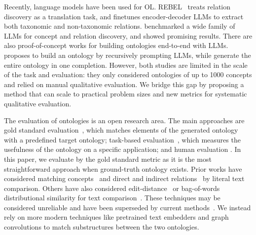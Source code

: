 \documentclass{article}
\begin{document}
Recently, language models have been used for OL. REBEL~\cite{cabot2021rebel} treats relation discovery as a translation task, and finetunes encoder-decoder LLMs to extract both taxonomic and non-taxonomic relations. \citet{babaei2023llms4ol} benchmarked a wide family of LLMs for concept and relation discovery, and showed promising results. There are also proof-of-concept works for building ontologies end-to-end with LLMs. \citet{funk2023towards} proposes to build an ontology by recursively prompting  LLMs, while \citet{trajanoska2023enhancing} generate the entire ontology in one completion. However, both studies are limited in the scale of the task and evaluation: they only considered ontologies of up to 1000 concepts and relied on manual qualitative evaluation. We bridge this gap by proposing a method that can scale to practical problem sizes and new metrics for systematic qualitative evaluation.

The evaluation of ontologies is an open research area. The main approaches are gold standard evaluation~\cite{Zavitsanos2011GoldSE}, which matches elements of the generated ontology with a predefined target ontology; task-based evaluation~\cite{porzel2004task}, which measures the usefulness of the ontology on a specific application; and human evaluation \cite{raad2015survey,brank2005survey}. In this paper, we evaluate by the gold standard metric as it is the most straightforward approach when ground-truth ontology exists. Prior works have considered matching concepts~\cite{maedche2002measuring} and direct and indirect relations~\cite{Kashyap2005TaxaMinerAE, Treeratpituk2013GraphbasedAT} by literal text comparison. Others have also considered edit-distance~\cite{Ehrig2005SimilarityFO} or bag-of-words distributional similarity for text comparison~\cite{Zavitsanos2011GoldSE}.  These techniques may be considered unreliable and have been superseded by current methods~\cite{conneau2017supervised}. We instead rely on more modern techniques like pretrained text embedders \cite{devlin2018bert} and graph convolutions \cite{kipf2016semi} to match substructures between the two ontologies. 
\end{document}
